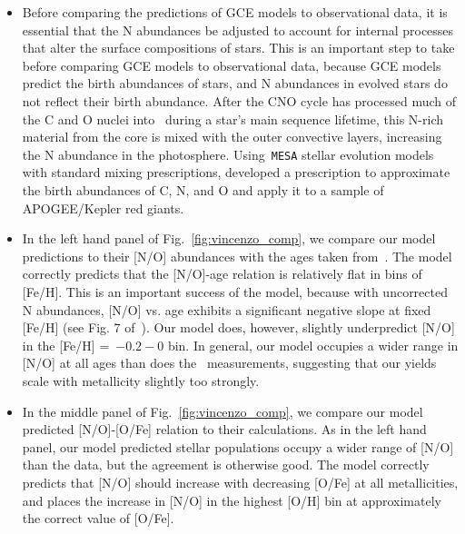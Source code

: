 \documentclass[ms.tex]{subfiles}
\begin{document}
\begin{itemize} 
	\item Before comparing the predictions of GCE models to observational data, 
	it is essential that the N abundances be adjusted to account for internal 
	processes that alter the surface compositions of stars. 
	This is an important step to take before comparing GCE models to 
	observational data, because GCE models predict the birth abundances of 
	stars, and N abundances in evolved stars do not reflect their birth 
	abundance. 
	After the CNO cycle has processed much of the C and O nuclei into~\Nfourteen 
	during a star's main sequence lifetime, this N-rich material from the core 
	is mixed with the outer convective layers, increasing the N abundance in 
	the photosphere. 
	Using~\texttt{MESA} stellar evolution models~\citep{Paxton2011, Paxton2013, 
	Paxton2015, Paxton2018} with standard mixing prescriptions, 
	\citet{Vincenzo2021} developed a prescription to approximate the birth 
	abundances of C, N, and O and apply it to a sample of APOGEE/Kepler red 
	giants. 

	\item In the left hand panel of Fig.~\ref{fig:vincenzo_comp}, we compare 
	our model predictions to their [N/O] abundances with the ages taken 
	from~\citet{Miglio2021}. 
	The model correctly predicts that the [N/O]-age relation is relatively flat 
	in bins of [Fe/H]. 
	This is an important success of the model, because with uncorrected N 
	abundances, [N/O] vs. age exhibits a significant negative slope at fixed 
	[Fe/H] (see Fig. 7 of~\citealp{Vincenzo2021}). 
	Our model does, however, slightly underpredict [N/O] in the 
	[Fe/H] =~$-0.2 - 0$ bin. 
	In general, our model occupies a wider range in [N/O] at all ages than does 
	the~\citet{Vincenzo2021} measurements, suggesting that our yields scale 
	with metallicity slightly too strongly. 

	\item In the middle panel of Fig.~\ref{fig:vincenzo_comp}, we compare 
	our model predicted [N/O]-[O/Fe] relation to their calculations. 
	As in the left hand panel, our model predicted stellar populations occupy a 
	wider range of [N/O] than the data, but the agreement is otherwise good. 
	The model correctly predicts that [N/O] should increase with decreasing 
	[O/Fe] at all metallicities, and places the increase in [N/O] in the 
	highest [O/H] bin at approximately the correct value of [O/Fe]. 


\end{itemize}
\end{document}
